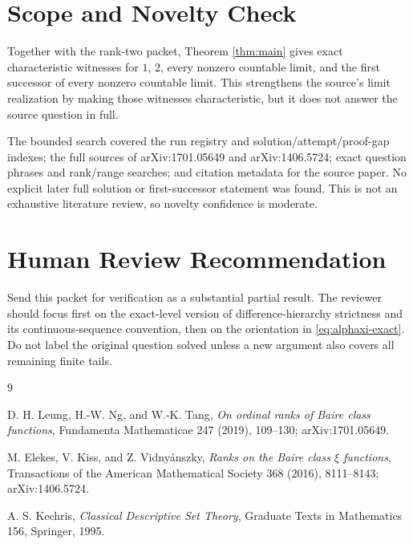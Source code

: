 \documentclass[11pt]{article}
\begin{document}
\section*{Scope and Novelty Check}

Together with the rank-two packet, Theorem \ref{thm:main} gives exact
characteristic witnesses for $1$, $2$, every nonzero countable limit, and
the first successor of every nonzero countable limit.  This strengthens the
source's limit realization by making those witnesses characteristic, but it
does not answer the source question in full.

The bounded search covered the run registry and solution/attempt/proof-gap
indexes; the full sources of arXiv:1701.05649 and arXiv:1406.5724; exact
question phrases and rank/range searches; and citation metadata for the
source paper.  No explicit later full solution or first-successor statement
was found.  This is not an exhaustive literature review, so novelty
confidence is moderate.

\section*{Human Review Recommendation}

Send this packet for verification as a substantial partial result.  The
reviewer should focus first on the exact-level version of difference-hierarchy
strictness and its continuous-sequence convention, then on the orientation in
\eqref{eq:alphaxi-exact}.  Do not label the original question solved unless a
new argument also covers all remaining finite tails.

\begin{thebibliography}{9}

D. H. Leung, H.-W. Ng, and W.-K. Tang,
\emph{On ordinal ranks of Baire class functions},
Fundamenta Mathematicae 247 (2019), 109--130;
arXiv:1701.05649.

M. Elekes, V. Kiss, and Z. Vidny\'anszky,
\emph{Ranks on the Baire class $\xi$ functions},
Transactions of the American Mathematical Society 368 (2016), 8111--8143;
arXiv:1406.5724.

A. S. Kechris,
\emph{Classical Descriptive Set Theory},
Graduate Texts in Mathematics 156, Springer, 1995.

\end{thebibliography}
\end{document}
